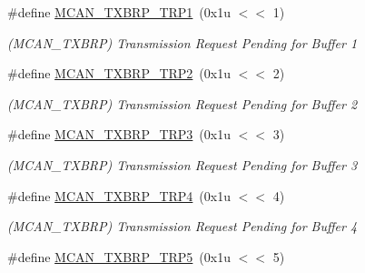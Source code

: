 \begin{DoxyCompactItemize}
\mbox{\label{group__SAME70__MCAN_ga6514c57bd759173589727eb0e987350d}} 
\#define \mbox{\hyperlink{group__SAME70__MCAN_ga6514c57bd759173589727eb0e987350d}{M\+C\+A\+N\+\_\+\+T\+X\+B\+R\+P\+\_\+\+T\+R\+P1}}~(0x1u $<$$<$ 1)
\begin{DoxyCompactList}\small\item\em (M\+C\+A\+N\+\_\+\+T\+X\+B\+RP) Transmission Request Pending for Buffer 1 \end{DoxyCompactList}\item 
\mbox{\label{group__SAME70__MCAN_gafc9654b93bc2541d31ded01aeb42d44d}} 
\#define \mbox{\hyperlink{group__SAME70__MCAN_gafc9654b93bc2541d31ded01aeb42d44d}{M\+C\+A\+N\+\_\+\+T\+X\+B\+R\+P\+\_\+\+T\+R\+P2}}~(0x1u $<$$<$ 2)
\begin{DoxyCompactList}\small\item\em (M\+C\+A\+N\+\_\+\+T\+X\+B\+RP) Transmission Request Pending for Buffer 2 \end{DoxyCompactList}\item 
\mbox{\label{group__SAME70__MCAN_gadbbdac7a8852e015438aba7c93912523}} 
\#define \mbox{\hyperlink{group__SAME70__MCAN_gadbbdac7a8852e015438aba7c93912523}{M\+C\+A\+N\+\_\+\+T\+X\+B\+R\+P\+\_\+\+T\+R\+P3}}~(0x1u $<$$<$ 3)
\begin{DoxyCompactList}\small\item\em (M\+C\+A\+N\+\_\+\+T\+X\+B\+RP) Transmission Request Pending for Buffer 3 \end{DoxyCompactList}\item 
\mbox{\label{group__SAME70__MCAN_gaa51d8b866dd4623f162269b3663cbe0d}} 
\#define \mbox{\hyperlink{group__SAME70__MCAN_gaa51d8b866dd4623f162269b3663cbe0d}{M\+C\+A\+N\+\_\+\+T\+X\+B\+R\+P\+\_\+\+T\+R\+P4}}~(0x1u $<$$<$ 4)
\begin{DoxyCompactList}\small\item\em (M\+C\+A\+N\+\_\+\+T\+X\+B\+RP) Transmission Request Pending for Buffer 4 \end{DoxyCompactList}\item 
\mbox{\label{group__SAME70__MCAN_ga5f3129ebd06da4027668e161a27dd8eb}} 
\#define \mbox{\hyperlink{group__SAME70__MCAN_ga5f3129ebd06da4027668e161a27dd8eb}{M\+C\+A\+N\+\_\+\+T\+X\+B\+R\+P\+\_\+\+T\+R\+P5}}~(0x1u $<$$<$ 5)
$$
\end{DoxyCompactItemize}
